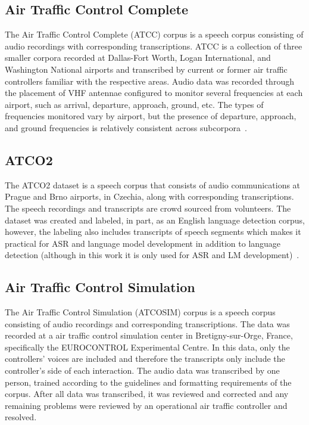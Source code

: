 \documentclass[12pt]{article}
\begin{document}
\subsection{Air Traffic Control Complete}\label{sec:atcc}
The Air Traffic Control Complete (ATCC) corpus is a speech corpus consisting of audio recordings with corresponding transcriptions.
ATCC is a collection of three smaller corpora recorded at Dallas-Fort Worth, Logan International, and Washington National airports and
transcribed by current or former air traffic controllers familiar with the respective areas. Audio data was recorded through the placement of VHF
antennae configured to monitor several frequencies at each airport, such as arrival, departure, approach, ground, etc. The types of frequencies
monitored vary by airport, but the presence of departure, approach, and ground frequencies is relatively consistent across subcorpora~\cite{godfrey_air_1994}.

\subsection{ATCO2}\label{sec:atco2}
The ATCO2 dataset is a speech corpus that consists of audio communications at Prague and Brno airports, in Czechia, along with corresponding
transcriptions. The speech recordings and transcripts are crowd sourced from volunteers. The dataset was created and labeled, in part, as an English
language detection corpus, however, the labeling also includes transcripts of speech segments which makes it practical for ASR and language model
development in addition to language detection (although in this work it is only used for ASR and LM development)~\cite{szoke_detecting_2021}.


\subsection{Air Traffic Control Simulation}\label{sec:atcosim}
The Air Traffic Control Simulation (ATCOSIM) corpus is a speech corpus consisting of audio recordings and corresponding transcriptions.
The data was recorded at a air traffic control simulation center in Bretigny-sur-Orge, France, specifically the EUROCONTROL Experimental Centre.
In this data, only the controllers' voices are included and therefore the transcripts only include the controller's side of each interaction.
The audio data was transcribed by one person, trained according to the guidelines and formatting requirements of the corpus. After all data was
transcribed, it was reviewed and corrected and any remaining problems were reviewed by an operational air traffic controller and
resolved\cite{hofbauer_atcosim_2008}.
\end{document}
